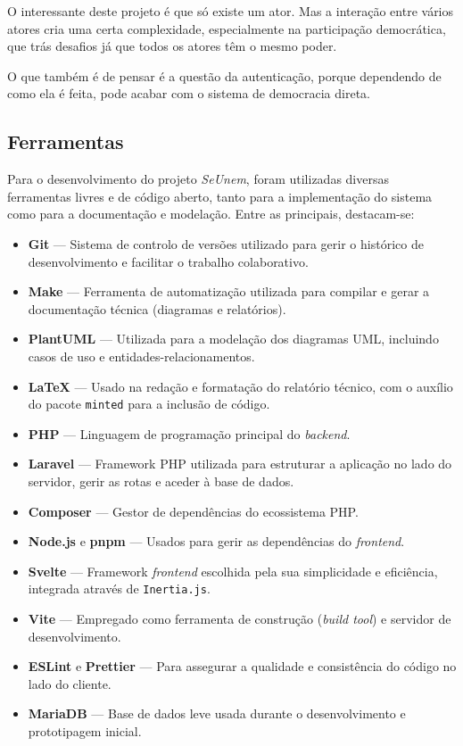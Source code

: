 \documentclass[12pt,a4paper,openright,oneside]{memoir}
\begin{document}
O interessante deste projeto é que só existe um ator. Mas a interação entre
vários atores cria uma certa complexidade, especialmente na participação
democrática, que trás desafios já que todos os atores têm o mesmo poder.

O que também é de pensar é a questão da autenticação, porque dependendo de como
ela é feita, pode acabar com o sistema de democracia direta.

\subsection{Ferramentas}
\label{sec:ferramentas}

Para o desenvolvimento do projeto \textit{SeUnem}, foram utilizadas diversas
ferramentas livres e de código aberto, tanto para a implementação do sistema
como para a documentação e modelação. Entre as principais, destacam-se:

\begin{itemize}
  \item \textbf{Git} — Sistema de controlo de versões utilizado para gerir o
  histórico de desenvolvimento e facilitar o trabalho colaborativo.
  \item \textbf{Make} — Ferramenta de automatização utilizada para compilar e
  gerar a documentação técnica (diagramas e relatórios).
  \item \textbf{PlantUML} — Utilizada para a modelação dos diagramas UML,
  incluindo casos de uso e entidades-relacionamentos.
  \item \textbf{LaTeX} — Usado na redação e formatação do relatório técnico,
  com o auxílio do pacote \texttt{minted} para a inclusão de código.
  \item \textbf{PHP} — Linguagem de programação principal do \textit{backend}.
  \item \textbf{Laravel} — Framework PHP utilizada para estruturar a aplicação
  no lado do servidor, gerir as rotas e aceder à base de dados.
  \item \textbf{Composer} — Gestor de dependências do ecossistema PHP.
  \item \textbf{Node.js} e \textbf{pnpm} — Usados para gerir as dependências
  do \textit{frontend}.
  \item \textbf{Svelte} — Framework \textit{frontend} escolhida pela sua
  simplicidade e eficiência, integrada através de \texttt{Inertia.js}.
  \item \textbf{Vite} — Empregado como ferramenta de construção (\textit{build
  tool}) e servidor de desenvolvimento.
  \item \textbf{ESLint} e \textbf{Prettier} — Para assegurar a qualidade e
  consistência do código no lado do cliente.
  \item \textbf{MariaDB} — Base de dados leve usada durante o desenvolvimento e
  prototipagem inicial.
\end{itemize}
\end{document}
